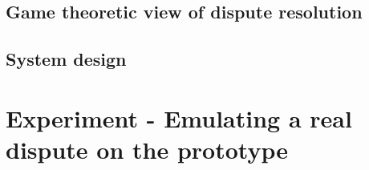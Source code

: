 \documentclass[12pt,msc,a4paper,oneside]{ucl_thesis}
\begin{document}




\section{Game theoretic view of dispute resolution} \label{sec:game_theoretic_view}
\section{System design}

\chapter{Experiment - Emulating a real dispute on the prototype}



\end{document}
